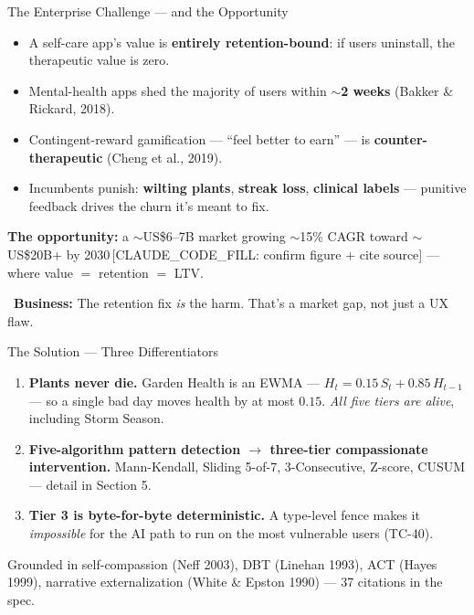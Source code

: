 \documentclass[aspectratio=169,11pt]{beamer}
\providecommand{\faChartPie}{}
\newcommand{\biz}[1]{\vspace{0.3em}\par{\footnotesize\color{moodorange}\faChartPie\ \textbf{Business:} #1}}
\begin{document}
\begin{frame}{The Enterprise Challenge --- and the Opportunity}
  \begin{itemize}
    \item A self-care app's value is \textbf{entirely retention-bound}: if users uninstall, the therapeutic value is zero.
    \item Mental-health apps shed the majority of users within \textbf{$\sim$2 weeks} (Bakker \& Rickard, 2018).
    \item Contingent-reward gamification --- ``feel better to earn'' --- is \textbf{counter-therapeutic} (Cheng et al., 2019).
    \item Incumbents punish: \textbf{wilting plants}, \textbf{streak loss}, \textbf{clinical labels} --- punitive feedback drives the churn it's meant to fix.
  \end{itemize}
  \vspace{0.2em}
  {\footnotesize\color{moodgreendark}\textbf{The opportunity:} a $\sim$US\$6--7B market growing $\sim$15\% CAGR toward $\sim$US\$20B+ by 2030\,{[CLAUDE\_CODE\_FILL: confirm figure + cite source]} --- where value $=$ retention $=$ LTV.}
  \biz{The retention fix \emph{is} the harm. That's a market gap, not just a UX flaw.}
\end{frame}

\begin{frame}{The Solution --- Three Differentiators}
  \begin{enumerate}
    \item[\textbf{1.}] \textbf{Plants never die.} Garden Health is an EWMA --- $H_t = 0.15\,S_t + 0.85\,H_{t-1}$ --- so a single bad day moves health by at most $0.15$. \emph{All five tiers are alive}, including Storm Season.
    \item[\textbf{2.}] \textbf{Five-algorithm pattern detection $\to$ three-tier compassionate intervention.} Mann-Kendall, Sliding 5-of-7, 3-Consecutive, Z-score, CUSUM --- detail in Section 5.
    \item[\textbf{3.}] \textbf{Tier 3 is byte-for-byte deterministic.} A type-level fence makes it \emph{impossible} for the AI path to run on the most vulnerable users (TC-40).
  \end{enumerate}
  {\footnotesize\color{gray!70} Grounded in self-compassion (Neff 2003), DBT (Linehan 1993), ACT (Hayes 1999), narrative externalization (White \& Epston 1990) --- 37 citations in the spec.}
\end{frame}
\end{document}
